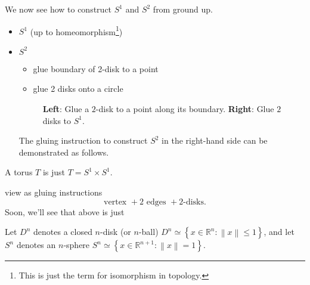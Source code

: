 \begin{eg}
	We now see how to construct \(S^1\) and \(S^2\) from ground up.
	\begin{itemize}
		\item \(S^1\) (up to homeomorphism\footnote{This is just the term for isomorphism in topology.})
		      \begin{center}
		      \end{center}
		\item \(S^2\)
		      \begin{itemize}
			      \item glue boundary of 2-disk to a point
			      \item glue 2 disks onto a circle
		      \end{itemize}
		      \begin{figure}[H]
			      \centering
			      \caption{\textbf{Left}: Glue a \(2\)-disk to a point along its boundary. \textbf{Right}: Glue \(2\) disks to \(S^1\).}
			      \label{fig:eg:constructing-sphere-2}
		      \end{figure}
		      The gluing instruction to construct \(S^2\) in the right-hand side can be demonstrated as follows.
		      \begin{center}
		      \end{center}
	\end{itemize}
\end{eg}
\begin{eg}
	A torus \(T\) is just \(T = S^1 \times S^1\).
	\begin{center}
	\end{center}
	view as gluing instructions
	\[
		\text{vertex }+ 2 \text{ edges }+2\text{-disks}.
	\]
	Soon, we'll see that above is just
	\begin{center}
	\end{center}
\end{eg}


\begin{notation}
	Let \(D^n\) denotes a closed \(n\)-disk (or \(n\)-ball) \(D^n\simeq \left\{x\in\mathbb{R} ^n\colon \left\lVert x\right\rVert \leq 1\right\}\),
	and let \(S^n\) denotes an \(n\)-sphere \(S^n\simeq \left\{x\in \mathbb{R}^{n+1}\colon \left\lVert x\right\rVert = 1\right\}\).
\end{notation}

